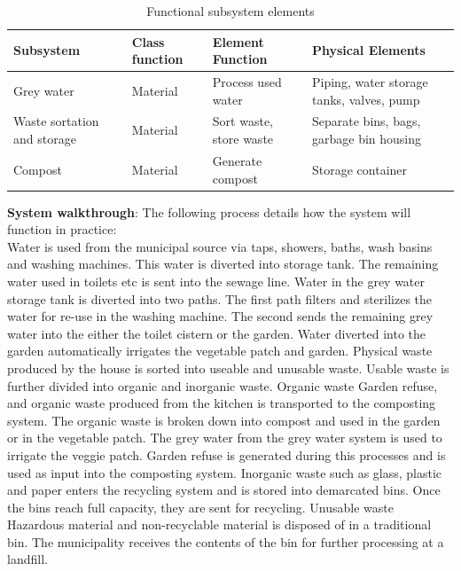 \documentclass[a4paper,11pt,fleqn]{report}
\begin{document}
\begin{table}[h!]
\caption {Functional subsystem elements} \label{tb: Functional_SS_elements} 
\begin{center}
\begin{tabular}{p{3.5cm}|p{3cm}|p{3cm}|p{4cm}}\toprule
	{\textbf{Subsystem}} & {\textbf{Class function}} & {\textbf{Element Function}} & {\textbf{Physical Elements}}\\ \midrule
    Grey water & Material & Process used water & Piping, water storage tanks, valves, pump\\
    \hline
    Waste sortation and storage & Material & Sort waste, store waste & Separate bins, bags, garbage bin housing\\
    \hline
        Compost & Material & Generate compost & Storage container\\
    \bottomrule
\end{tabular}
\end{center}
\end{table}

\textbf{System walkthrough}: The following process details how the system will function in practice:\\

Water is used from the municipal source via taps, showers, baths, wash basins and washing machines. This water is diverted into storage tank. The remaining water used in toilets etc is sent into the sewage line. Water in the grey water storage tank is diverted into two paths. The first path filters and sterilizes the water for re-use in the washing machine. The second sends the remaining grey water into the either the toilet cistern or the garden.
Water diverted into the garden automatically irrigates the vegetable patch and garden. Physical waste produced by the house is sorted into useable and unusable waste. Usable waste is further divided into organic and inorganic waste. Organic waste
Garden refuse, and organic waste produced from the kitchen is transported to the composting system.
The organic waste is broken down into compost and used in the garden or in the vegetable patch.
The grey water from the grey water system is used to irrigate the veggie patch. Garden refuse is generated during this processes and is used as input into the composting system. Inorganic waste such as glass, plastic and paper enters the recycling system and is stored into demarcated bins. Once the bins reach full capacity, they are sent for recycling. Unusable waste
Hazardous material and non-recyclable material is disposed of in a traditional bin. The municipality receives the contents of the bin for further processing at a landfill.
\end{document}
